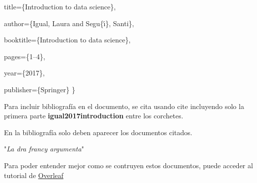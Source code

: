 \documentclass[twocolumn,10pt]{article}
\begin{document}
  title=\{Introduction to data science\},
  
  author=\{Igual, Laura and Segu\{\'\i\}, Santi\},
  
  booktitle=\{Introduction to data science\},
  
  pages=\{1--4\},
  
  year=\{2017\},
  
  publisher=\{Springer\}
\}


Para incluir bibliografía en el documento, se cita usando cite incluyendo solo la primera parte \textbf{igual2017introduction} entre los corchetes. \citep{basel2000principles} \citep{jappelli1990who} \cite[p. ~10]{mcgrayne2011theory} \cite{campbell} \cite{KOUROU20158}

En la bibliografía solo deben aparecer los documentos citados.


\noindent "\textit{La dra francy argumenta}"\cite{crook2012relationship}


Para poder entender mejor como se contruyen estos documentos, puede acceder al tutorial de \href{https://es.overleaf.com/learn/latex/Learn_LaTeX_in_30_minutes}{Overleaf}























\end{document}
